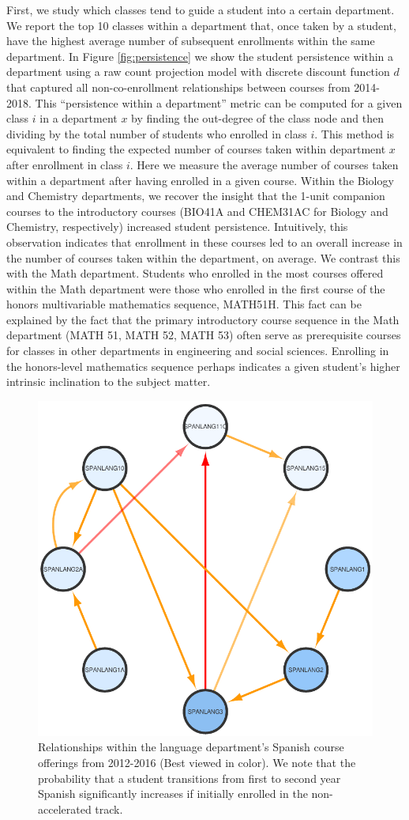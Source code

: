 \documentclass{sigchi}
\begin{document}
First, we study which classes tend to guide a student into a certain
department. We report the top 10 classes within a department that,
once taken by a student, have the highest average number of subsequent
enrollments within the same department. In Figure
\ref{fig:persistence} we show the student persistence within a
department using a raw count projection model with discrete discount
function $d$ that captured all non-co-enrollment relationships between
courses from 2014-2018.  This ``persistence within a department''
metric can be computed for a given class $i$ in a department $x$ by
finding the out-degree of the class node and then dividing by the
total number of students who enrolled in class $i$. This method is
equivalent to finding the expected number of courses taken within
department $x$ after enrollment in class $i$. Here we measure the
average number of courses taken within a department after having
enrolled in a given course. Within the Biology and Chemistry
departments, we recover the insight that the 1-unit companion courses
to the introductory courses (BIO41A and CHEM31AC for Biology and
Chemistry, respectively) increased student persistence. Intuitively,
this observation indicates that enrollment in these courses led to an
overall increase in the number of courses taken within the department,
on average. We contrast this with the Math department. Students who
enrolled in the most courses offered within the Math department were
those who enrolled in the first course of the honors multivariable
mathematics sequence, MATH51H. This fact can be explained by the fact that the primary introductory course sequence in the Math department (MATH 51, MATH 52, MATH 53) often serve as prerequisite courses for classes in other departments in engineering and social sciences. Enrolling in the honors-level mathematics sequence perhaps indicates a given student's higher intrinsic inclination to the subject matter.
\begin{figure}[h]
    \centering
    \includegraphics[width=0.4\columnwidth]{final-spanlang.pdf}  
    \caption{Relationships within the language department's Spanish course offerings from 2012-2016 (Best viewed in color). We note that the probability that a student transitions from first to second year Spanish significantly increases if initially enrolled in the non-accelerated track.}
    \label{fig:spanlang}
\end{figure}
\end{document}
